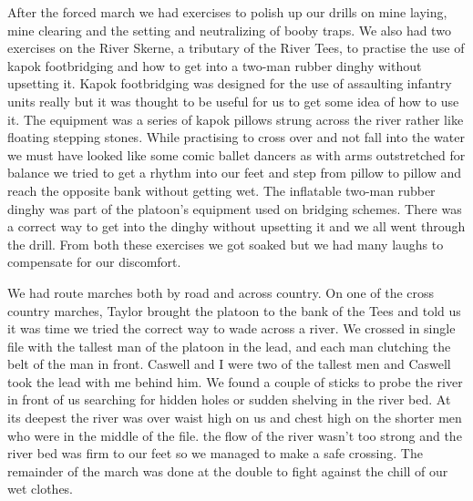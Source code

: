 After the forced march we had exercises to polish up our drills on
mine laying, mine clearing and the setting and neutralizing of booby
traps. We also had two exercises on the River Skerne, a tributary of
the River Tees, to practise the use of kapok footbridging and how to
get into a two-man rubber dinghy without upsetting it. Kapok
footbridging was designed for the use of assaulting infantry units
really but it was thought to be useful for us to get some idea of how
to use it. The equipment was a series of kapok pillows strung across
the river rather like floating stepping stones. While practising to
cross over and not fall into the water we must have looked like some
comic ballet dancers as with arms outstretched for balance we tried to
get a rhythm into our feet and step from pillow to pillow and reach
the opposite bank without getting wet. The inflatable two-man rubber
dinghy was part of the platoon's equipment used on bridging schemes.
There was a correct way to get into the dinghy without upsetting it
and we all went through the drill. From both these exercises we got
soaked but we had many laughs to compensate for our discomfort.

We had route marches both by road and across country. On one of the
cross country marches, \lieutenant Taylor brought the platoon to the
bank of the Tees and told us it was time we tried the correct way to
wade across a river. We crossed in single file with the tallest man of
the platoon in the lead, and each man clutching the belt of the man in
front. \Sapper Caswell and I were two of the tallest men and Caswell
took the lead with me behind him. We found a couple of sticks to
probe the river in front of us searching for hidden holes or sudden
shelving in the river bed. At its deepest the river was over waist
high on us and chest high on the shorter men who were in the middle of
the file. the flow of the river wasn't too strong and the river bed
was firm to our feet so we managed to make a safe crossing. The
remainder of the march was done at the double to fight against the
chill of our wet clothes.

